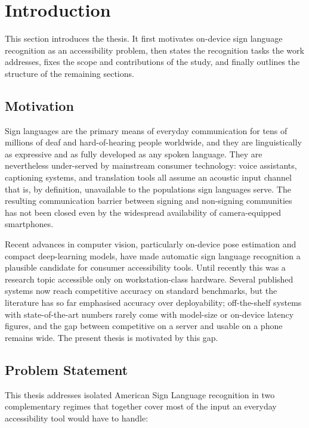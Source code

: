 \chapter{Introduction}
\label{ch:introduction}

This section introduces the thesis. It first motivates on-device sign
language recognition as an accessibility problem, then states the
recognition tasks the work addresses, fixes the scope and
contributions of the study, and finally outlines the structure of the
remaining sections.

\section{Motivation}
\label{sec:intro-motivation}

Sign languages are the primary means of everyday communication for
tens of millions of deaf and hard-of-hearing people worldwide, and
they are linguistically as expressive and as fully developed as any
spoken language. They are nevertheless under-served by mainstream
consumer technology: voice assistants, captioning systems, and
translation tools all assume an acoustic input channel that is, by
definition, unavailable to the populations sign languages serve. The
resulting communication barrier between signing and non-signing
communities has not been closed even by the widespread availability of
camera-equipped smartphones.

Recent advances in computer vision, particularly on-device pose
estimation and compact deep-learning models, have made automatic sign
language recognition a plausible candidate for consumer accessibility
tools. Until recently this was a research topic accessible only on
workstation-class hardware. Several published systems now reach competitive
accuracy on standard benchmarks, but the literature has so far
emphasised accuracy over deployability; off-the-shelf systems with
state-of-the-art numbers rarely come with model-size or on-device
latency figures, and the gap between competitive on a server and
usable on a phone remains wide. The present thesis is motivated by
this gap.

\section{Problem Statement}
\label{sec:intro-problem}

This thesis addresses isolated American Sign Language recognition in
two complementary regimes that together cover most of the input an
everyday accessibility tool would have to handle:

